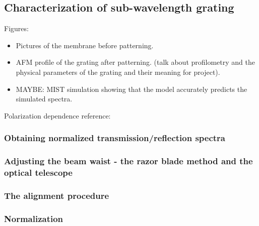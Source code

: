 \subsection{Characterization of sub-wavelength grating}\label{sec:grating_characterization}

Figures:
\begin{itemize}
    \item Pictures of the membrane before patterning.
    \item AFM profile of the grating after patterning. (talk about profilometry and the physical parameters of the grating and their meaning for project).
    \item MAYBE: MIST simulation showing that the model accurately predicts the simulated spectra.
\end{itemize}

Polarization dependence reference: \cite{Ko}

\subsubsection{Obtaining normalized transmission/reflection spectra}

\subsubsection{Adjusting the beam waist - the razor blade method and the optical telescope}

\subsubsection{The alignment procedure}

\subsubsection{Normalization}
